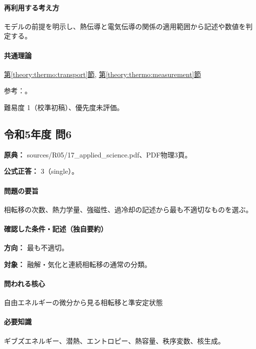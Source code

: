 \paragraph{再利用する考え方} モデルの前提を明示し、熱伝導と電気伝導の関係の適用範囲から記述や数値を判定する。

\paragraph{共通理論} \hyperref[theory:thermo:transport]{第\ref*{theory:thermo:transport}節}, \hyperref[theory:thermo:measurement]{第\ref*{theory:thermo:measurement}節}

\par 参考：\cite{aist_metal_thermal,wang_sun_diamond2024}。

\par 難易度 1（校準初稿）、優先度未評価。

\subsection{令和5年度 問6}
\label{q:r05-reg-applied-06}

\noindent\textbf{原典：} sources/R05/17\_applied\_science.pdf、PDF物理3頁。

\textbf{公式正答：} 3（single）。

\paragraph{問題の要旨} 相転移の次数、熱力学量、強磁性、過冷却の記述から最も不適切なものを選ぶ。

\paragraph{確認した条件・記述（独自要約）}\mbox{}\par

\noindent\textbf{方向：} 最も不適切。\par

\noindent\textbf{対象：} 融解・気化と連続相転移の通常の分類。\par

\paragraph{問われる核心} 自由エネルギーの微分から見る相転移と準安定状態

\paragraph{必要知識} ギブズエネルギー、潜熱、エントロピー、熱容量、秩序変数、核生成。

